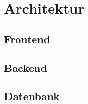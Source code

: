 \section{Architektur}\label{sec:architecture}

\subsection{Frontend}\label{subsec:frontend}


\subsection{Backend}\label{subsec:backend}


\subsection{Datenbank}\label{subsec:database}

